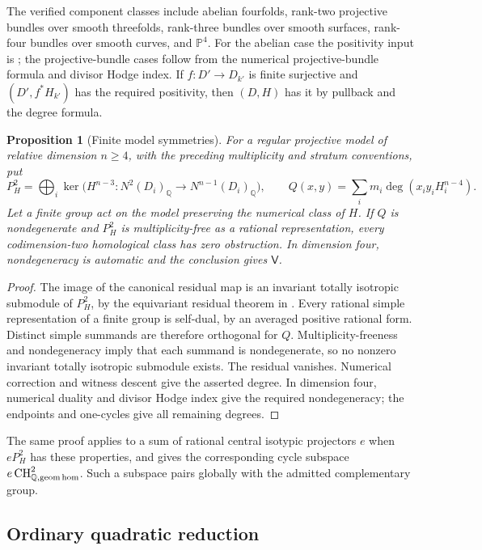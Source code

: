 \documentclass[11pt,a4paper]{article}
\newtheorem{proposition}[theorem]{Proposition}
\theoremstyle{definition}
\theoremstyle{remark}\newtheorem{remark}[theorem]{Remark}
\numberwithin{equation}{section}
\newcommand{\Q}{\mathbb Q}\newcommand{\R}{\mathbb R}\newcommand{\C}{\mathbb C}
\newcommand{\PP}{\mathbb P}\newcommand{\LL}{\mathbb L}
\newcommand{\CH}{\operatorname{CH}}\newcommand{\an}{\mathrm{an}}
\begin{document}
The verified component classes include abelian fourfolds, rank-two
projective bundles over smooth threefolds, rank-three bundles over
smooth surfaces, rank-four bundles over smooth curves, and $\PP^4$.
For the abelian case the positivity input is \cite{Ancona}; the
projective-bundle cases follow from the numerical projective-bundle
formula and divisor Hodge index. If $f:D'\to D_{k'}$ is finite
surjective and $(D',f^*H_{k'})$ has the required positivity, then
$(D,H)$ has it by pullback and the degree formula.

\begin{proposition}[Finite model symmetries]\label{prop:symmetry-model}
For a regular projective model of relative dimension $n\geq4$,
with the preceding multiplicity and stratum conventions, put
\[
 P_H^2=\bigoplus_i\ker\bigl(H^{n-3}:N^2(D_i)_\Q\to
                                    N^{n-1}(D_i)_\Q\bigr),
 \qquad Q(x,y)=\sum_i m_i\deg(x_iy_iH_i^{n-4}).
\]
Let a finite group act on the model preserving the numerical class
of $H$. If $Q$ is nondegenerate and $P_H^2$ is multiplicity-free
as a rational representation, every codimension-two homological
class has zero obstruction. In dimension four, nondegeneracy is
automatic and the conclusion gives $\mathsf V$.
\end{proposition}

\begin{proof}
The image of the canonical residual map is an invariant totally
isotropic submodule of $P_H^2$, by the equivariant residual theorem
in \cite{InternalModelCriteria}. Every rational simple representation
of a finite group is self-dual, by an averaged positive rational
form. Distinct simple summands are therefore orthogonal for $Q$.
Multiplicity-freeness and nondegeneracy imply that each summand is
nondegenerate, so no nonzero invariant totally isotropic submodule
exists. The residual vanishes. Numerical correction and witness
descent give the asserted degree. In dimension four, numerical
duality and divisor Hodge index give the required nondegeneracy;
the endpoints and one-cycles give all remaining degrees.
\end{proof}

The same proof applies to a sum of rational central isotypic
projectors $e$ when $eP_H^2$ has these properties, and gives the
corresponding cycle subspace $e\CH^2_{\Q,\geomhom}$. Such a
subspace pairs globally with the admitted complementary group.

\subsection{Ordinary quadratic reduction}\label{sub:ordinary-reduction}
\end{document}
